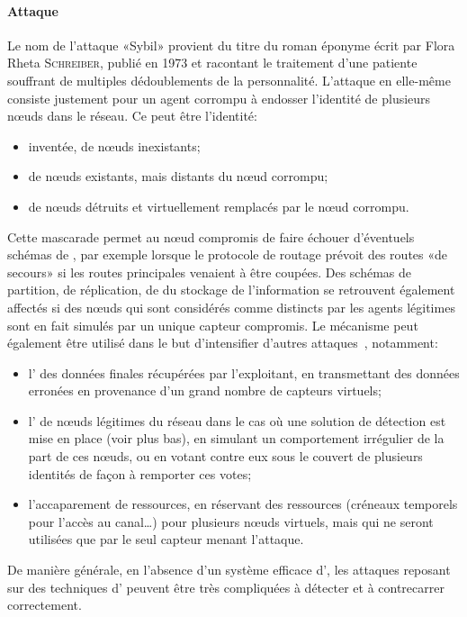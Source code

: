         \paragraph{Attaque }
Le nom de l'attaque «Sybil» provient du titre du roman éponyme écrit par Flora Rheta \textsc{Schreiber}, publié en 1973 et racontant le traitement d'une patiente souffrant de multiples dédoublements de la personnalité.
L'attaque en elle-même consiste justement pour un agent corrompu à endosser l'identité de plusieurs nœuds dans le réseau.
Ce peut être l'identité:
\begin{itemize}
    \item inventée, de nœuds inexistants;
    \item de nœuds existants, mais distants du nœud corrompu;
    \item de nœuds détruits et virtuellement remplacés par le nœud corrompu.
\end{itemize}
Cette mascarade permet au nœud compromis de faire échouer d'éventuels schémas de \resilience, par exemple lorsque le protocole de routage prévoit des routes «de secours» si les routes principales venaient à être coupées.
Des schémas de partition, de réplication, de  du stockage de l'information se retrouvent également affectés si des nœuds qui sont considérés comme distincts par les agents légitimes sont en fait simulés par un unique capteur compromis.
Le mécanisme peut également être utilisé dans le but d'intensifier d'autres attaques~\cite{NSSP04}, notamment:
\begin{itemize}
    \item l' des données finales récupérées par l'exploitant, en transmettant des données erronées en provenance d'un grand nombre de capteurs virtuels;
    \item l' de nœuds légitimes du réseau dans le cas où une solution de détection est mise en place (voir plus bas), en simulant un comportement irrégulier de la part de ces nœuds, ou en votant contre eux sous le couvert de plusieurs identités de façon à remporter ces votes;
    \item l'accaparement de ressources, en réservant des ressources (créneaux temporels pour l'accès au canal\dots) pour plusieurs nœuds virtuels, mais qui ne seront utilisées que par le seul capteur menant l'attaque.
\end{itemize}
De manière générale, en l'absence d'un système efficace d', les attaques reposant sur des techniques d' peuvent être très compliquées à détecter et à contrecarrer correctement.

